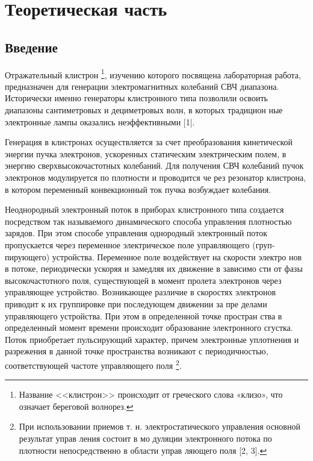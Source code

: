 
\usepackage{gensymb}
\usepackage{textcomp}
\usepackage{pythontex}


\def\labauthors{Карусевич А.А, Понур К.А.}
\def\labgroup{430}
\def\department{Кафедра электродинамики}
\def\labnumber{1}
\def\labtheme{Исследование отражательного клистрона}

\renewcommand{\Re}{\operatorname{Re}}
\renewcommand{\Im}{\operatorname{Im}}
\renewcommand{\phi}{\varphi}
\renewcommand{\hat}{\widehat}


\tableofcontents
\newpage

\section{Теоретическая часть}
\subsection{Введение}
Отражательный клистрон
\footnote{Название <<клистрон>> происходит от греческого слова «клизо», что означает береговой волнорез.}, 
изучению которого посвящена лабораторная
работа, предназначен для генерации электромагнитных колебаний СВЧ диа­пазона. Исторически именно генераторы клистронного типа позволили осво­ить диапазоны сантиметровых и дециметровых волн, в которых традицион­
ные электронные лампы оказались неэффективными [1|.

Генерация в клистронах осуществляется за счет преобразования кинети­ческой энергии пучка электронов, ускоренных статическим электрическим
полем, в энергию сверхвысокочастотных колебаний. Для получения СВЧ
колебаний пучок электронов модулируется по плотности и проводится че­
рез резонатор клистрона, в котором переменный конвекционный ток пучка
возбуждает колебания.

Неоднородный электронный поток в приборах клистронного типа созда­ется посредством так называемого динамического способа управления плот­ностью зарядов. При этом способе управления однородный электронный по­ток пропускается через переменное электрическое поле управляющего 
(груп­пирующего) устройства. Переменное поле воздействует на скорости электро­
нов в потоке, периодически ускоряя и замедляя их движение в зависимо­
сти от фазы высокочастотного поля, существующей в момент пролета элек­тронов через управляющее устройство. Возникающее различие в скоростях
электронов приводит к их группировке при последующем движении за пре­
делами управляющего устройства. При этом в определенной точке простран­
ства в определенный момент времени происходит образование электронного
сгустка. Поток приобретает пульсирующий характер, причем электронные
уплотнения и разрежения в данной точке пространства возникают с перио­дичностью, соответствующей частоте управляющего поля
\footnote{При использовании приемов т. н. электростатического управления основной результат управ­
ления состоит в мо дуляции электронного потока по плотности непосредственно в области управ­
ляющего поля [2, 3].}.

